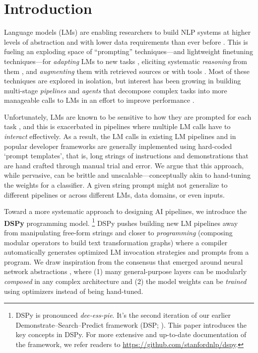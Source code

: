 \section{Introduction}


Language models (LMs) are enabling researchers to build NLP systems at higher levels of abstraction and with lower data requirements than ever before \citep{bommasani2021opportunities}. This is fueling an exploding space of ``prompting'' techniques---and lightweight finetuning techniques---for \textit{adapting} LMs to new tasks \citep{kojima2022large}, eliciting systematic \textit{reasoning} from them \citep{wei2022chain,wang2022self}, and \textit{augmenting} them with retrieved sources \citep{guu2020realm,lazaridou2022internet,khattab2022demonstrate} or with tools \citep{yao2022react,schick2023toolformer}. Most of these techniques are explored in isolation, but interest has been growing in building multi-stage \textit{pipelines} and \textit{agents} that decompose complex tasks into more manageable calls to LMs in an effort to improve performance \citep{qi2019answering,khattab2021baleen,karpas2022mrkl,dohan2022language,khot2022decomposed,khattab2022demonstrate,chen2022program,pourreza2023din,shinn2023reflexion}. 



Unfortunately, LMs are known to be sensitive to how they are prompted for each task%
, and this is exacerbated in pipelines where multiple LM calls have to \textit{interact} effectively. As a result, the LM calls in existing LM pipelines and in popular developer frameworks are generally implemented using hard-coded `prompt templates', that is, long strings of instructions and demonstrations that are hand crafted through manual trial and error. We argue that this approach, while pervasive, can be brittle and unscalable---conceptually akin to hand-tuning the weights for a classifier. A given string prompt might not generalize to different pipelines or across different LMs, data domains, or even inputs.







Toward a more systematic approach to designing AI pipelines, 
we introduce the \textbf{DSPy} programming model.%
\footnote{DSPy is pronounced \emph{dee-ess-pie}. It's the second iteration of our earlier Demonstrate–Search–Predict framework (DSP; \citealt{khattab2022demonstrate}).
This paper introduces the key concepts in DSPy.
For more extensive and up-to-date documentation of the framework, we refer readers to \url{https://github.com/stanfordnlp/dspy}.
}
DSPy pushes building new LM pipelines away from manipulating free-form strings and closer to \textit{programming} (composing modular operators to build text transformation graphs) where a compiler automatically generates optimized LM invocation strategies and prompts from a program. We draw inspiration from the consensus that emerged around neural network abstractions \citep{bergstra2013making}, where (1) many general-purpose layers can be modularly \textit{composed} in any complex architecture and (2) the model weights can be \textit{trained} using optimizers instead of being hand-tuned.

